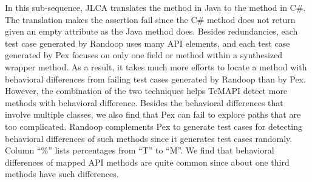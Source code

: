 In this sub-sequence, JLCA translates the  method in Java to the  method in C\#. The translation makes the assertion fail since the C\# method does not return  given an empty attribute as the Java method does. Besides redundancies, each test case generated by Randoop uses many API elements, and each test case generated by Pex focuses on only one field or method within a synthesized wrapper method. As a result, it takes much more efforts to locate a method with behavioral differences from failing test cases generated by Randoop than by Pex. However, the combination of the two techniques helps TeMAPI detect more methods with behavioral difference. Besides the behavioral differences that involve multiple classes, we also find that Pex can fail to explore paths that are too complicated. Randoop complements Pex to generate test cases for detecting behavioral differences of such methods since it generates test cases randomly. Column ``\%'' lists percentages from ``T'' to ``M''. We find that behavioral differences of mapped API methods are quite common since about one third methods have such differences.

